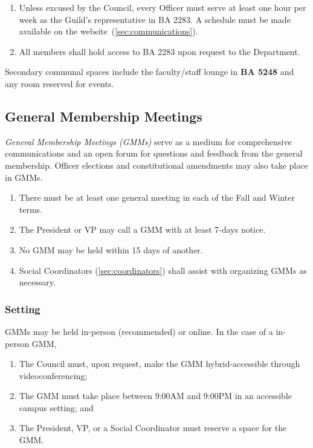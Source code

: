 \begin{enumerate}
      \item Unless excused by the Council, every Officer must serve at least one hour per
            week as the Guild's representative in BA 2283. A schedule must be made
            available on the website~(\ref{sec:communications}).
      \item All members shall hold access to BA 2283 upon request to the Department.
\end{enumerate}
Secondary communal spaces include the faculty/staff lounge in \textbf{BA 5248}
and any room reserved for events.

\subsection{General Membership Meetings}
\textit{General Membership Meetings (GMMs)} serve as a medium for comprehensive communications and an open forum for questions and feedback from the general membership. Officer elections and constitutional amendments may also take place in GMMs.

\begin{enumerate}
      \item There must be at least one general meeting in each of the Fall and Winter
            terms.
      \item The President or VP may call a GMM with at least 7-days notice.
      \item No GMM may be held within 15 days of another.
      \item Social Coordinators (\ref{sec:coordinators}) shall assist with organizing GMMs
            as necessary.
\end{enumerate}

\subsubsection{Setting}
GMMs may be held in-person (recommended) or online. In the case of a in-person
GMM,

\begin{enumerate}
      \item The Council must, upon request, make the GMM hybrid-accessible through
            videoconferencing;
      \item The GMM must take place between 9:00AM and 9:00PM in an accessible campus
            setting; and
      \item The President, VP, or a Social Coordinator must reserve a space for the GMM.\@
\end{enumerate}

